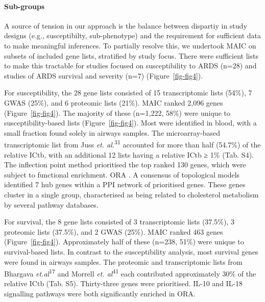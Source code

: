 \documentclass[
  11,
  a4paper,
]{article}
\let\oldparagraph\paragraph
\renewcommand{\paragraph}[1]{\oldparagraph{#1}\mbox{}}
\begin{document}
\hypertarget{sub-groups}{%
\paragraph{Sub-groups}\label{sub-groups}}

A source of tension in our approach is the balance between dispartiy in
study designs (e.g., susceptibilty, sub-phenotype) and the requirement
for sufficient data to make meaningful inferences. To partially resolve
this, we undertook MAIC on subsets of included gene lists, stratified by
study focus. There were sufficient lists to make this tractable for
studies focused on susceptibility to ARDS (n=28) and studies of ARDS
survival and severity (n=7) (Figure~\ref{fig-fig4}).

For susceptibility, the 28 gene lists consisted of 15 transcriptomic
lists (54\%), 7 GWAS (25\%), and 6 proteomic lists (21\%). MAIC ranked
2,096 genes (Figure~\ref{fig-fig4}). The majority of these (n=1,222,
58\%) were unique to susceptibility-based lists (Figure~\ref{fig-fig4}).
Most were identified in blood, with a small fraction found solely in
airways samples. The microarray-based transcriptomic list from Juss
\emph{et. al.}\textsuperscript{31} accounted for more than half (54.7\%)
of the relative ICtb, with an additional 12 lists having a relative ICtb
≥ 1\% (Tab. S4). The inflection point method prioritised the top ranked
130 genes, which were subject to functional enrichment. ORA . A
consensus of topological models identified 7 hub genes within a PPI
network of prioritised genes. These genes cluster in a single group,
characterised as being related to cholesterol metabolism by several
pathway databases.

For survival, the 8 gene lists consisted of 3 transcriptomic lists
(37.5\%), 3 proteomic lists (37.5\%), and 2 GWAS (25\%). MAIC ranked 463
genes (Figure~\ref{fig-fig4}). Approximately half of these (n=238, 51\%)
were unique to survival-based lists. In contrast to the susceptibility
analysis, most survival genes were found in airways samples. The
proteomic and transcriptomic lists from Bhargava
\emph{et.al}\textsuperscript{17} and Morrell \emph{et.
al}\textsuperscript{41} each contributed approximately 30\% of the
relative ICtb (Tab. S5). Thirty-three genes were prioritised. IL-10 and
IL-18 signalling pathways were both significantly enriched in ORA.
\end{document}
